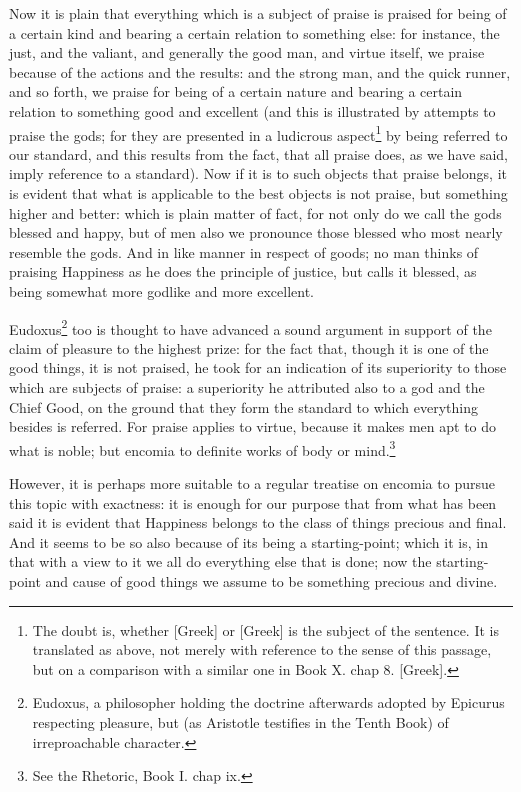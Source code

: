 Now it is plain that everything which is a subject of praise is praised for
being of a certain kind and bearing a certain relation to something else: for
instance, the just, and the valiant, and generally the good man, and virtue
itself, we praise because of the actions and the results: and the strong man,
and the quick runner, and so forth, we praise for being of a certain nature and
bearing a certain relation to something good and excellent (and this is
illustrated by attempts to praise the gods; for they are presented in a
ludicrous aspect\footnote{The doubt is, whether [Greek] or [Greek] is the subject of the sentence. It is
translated as above, not merely with reference to the sense of this passage,
but on a comparison with a similar one in Book X. chap 8. [Greek].}
by being referred to our standard, and this results from the fact, that all
praise does, as we have said, imply reference to a standard). Now if it is to
such objects that praise belongs, it is evident that what is applicable to the
best objects is not praise, but something higher and better: which is plain
matter of fact, for not only do we call the gods blessed and happy, but of men
also we pronounce those blessed who most nearly resemble the gods. And in like
manner in respect of goods; no man thinks of praising Happiness as he does the
principle of justice, but calls it blessed, as being somewhat more godlike and
more excellent.

Eudoxus\footnote{Eudoxus, a philosopher holding the doctrine afterwards adopted by Epicurus
respecting pleasure, but (as Aristotle testifies in the Tenth Book) of
irreproachable character.}
too is thought to have advanced a sound argument in support of the claim of
pleasure to the highest prize: for the fact that, though it is one of the good
things, it is not praised, he took for an indication of its superiority to
those which are subjects of praise: a superiority he attributed also to a god
and the Chief Good, on the ground that they form the standard to which
everything besides is referred. For praise applies to virtue, because it makes
men apt to do what is noble; but encomia to definite works of body or
mind.\footnote{See the Rhetoric, Book I. chap ix.}

However, it is perhaps more suitable to a regular treatise on encomia to pursue
this topic with exactness: it is enough for our purpose that from what has been
said it is evident that Happiness belongs to the class of things precious and
final. And it seems to be so also because of its being a starting-point; which
it is, in that with a view to it we all do everything else that is done; now
the starting-point and cause of good things we assume to be something precious
and divine.

